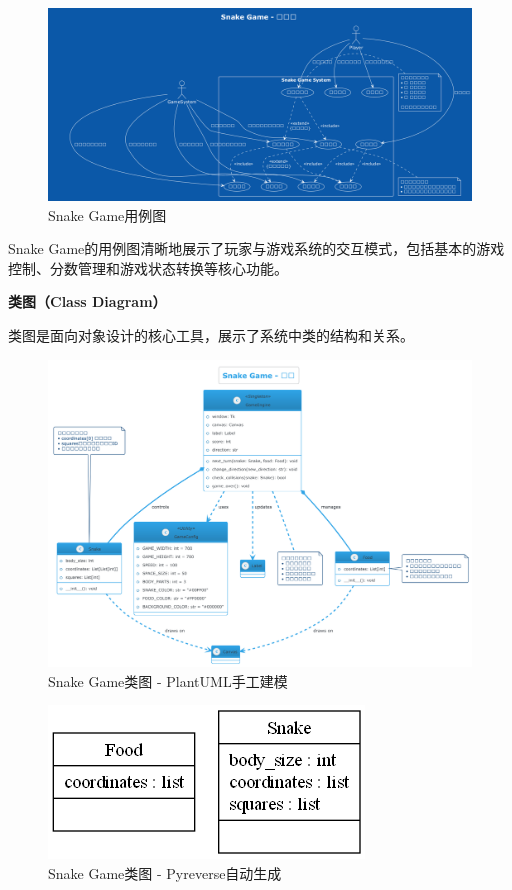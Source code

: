 \documentclass[a4paper]{article}
\begin{document}
\begin{figure}[H]
\centering
\includegraphics[width=\textwidth]{img/Snake_Game_UseCase.png}
\caption{Snake Game用例图}
\label{fig:snake_usecase}
\end{figure}

Snake Game的用例图清晰地展示了玩家与游戏系统的交互模式，包括基本的游戏控制、分数管理和游戏状态转换等核心功能。

\textbf{类图（Class Diagram）}

类图是面向对象设计的核心工具，展示了系统中类的结构和关系。

\begin{figure}[H]
\centering
\includegraphics[width=\textwidth]{img/Snake_Game_Class.png}
\caption{Snake Game类图 - PlantUML手工建模}
\label{fig:snake_class_manual}
\end{figure}

\begin{figure}[H]
\centering
\includegraphics[width=\textwidth]{img/classes_SnakeGame_Auto.png}
\caption{Snake Game类图 - Pyreverse自动生成}
\label{fig:snake_class_auto}
\end{figure}
\end{document}
